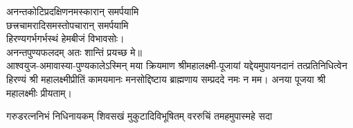 \begin{center}
अनन्तकोटिप्रदक्षिणनमस्कारान् समर्पयामि\\

छत्त्रचामरादिसमस्तोपचारान् समर्पयामि\\

हिरण्यगर्भगर्भस्थं हेमबीजं विभावसोः।\\
अनन्तपुण्यफलदम् अतः शान्तिं प्रयच्छ मे॥\\

आश्वयुज-अमावास्या-पुण्यकालेऽस्मिन् मया क्रियमाण श्री\-महा\-लक्ष्मी-पूजायां
यद्देयमुपायन\-दानं तत्प्रति\-निधित्वेन हिरण्यं श्री महा\-लक्ष्मी\-प्रीतिं
कामयमानः मनसोद्दिष्टाय ब्राह्मणाय सम्प्रददे नमः न मम। 
अनया पूजया श्री महालक्ष्मीः प्रीयताम्। 
\end{center}






{गरुडरत्ननिभं निधिनायकम्}
{शिवसखं मुकुटादिविभूषितम्}
{वररुचिं तमहमुपास्महे सदा}

